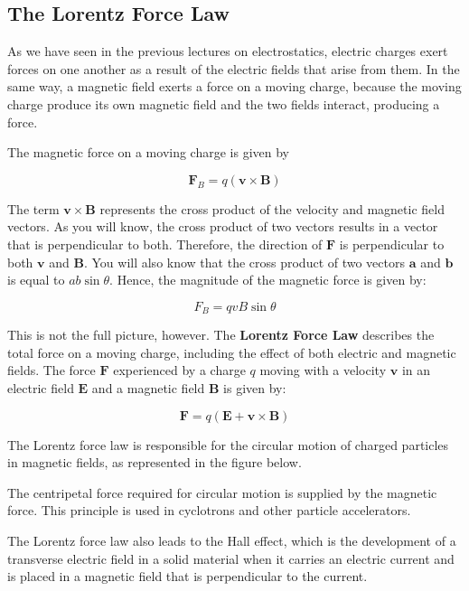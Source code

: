 \documentclass[
  letterpaper,
  DIV=11,
  numbers=noendperiod]{scrreprt}
\begin{document}
\subsection{The Lorentz Force Law}\label{the-lorentz-force-law}

As we have seen in the previous lectures on electrostatics, electric
charges exert forces on one another as a result of the electric fields
that arise from them. In the same way, a magnetic field exerts a force
on a moving charge, because the moving charge produce its own magnetic
field and the two fields interact, producing a force.

The magnetic force on a moving charge is given by

\[
\mathrm{\mathbf{F}}_B = q(\mathrm{\mathbf{v}}\times \mathrm{\mathbf{B}})
\]

The term \(\mathrm{\mathbf{v}}\times \mathrm{\mathbf{B}}\) represents
the cross product of the velocity and magnetic field vectors. As you
will know, the cross product of two vectors results in a vector that is
perpendicular to both. Therefore, the direction of
\(\mathrm{\mathbf{F}}\) is perpendicular to both \(\mathrm{\mathbf{v}}\)
and \(\mathrm{\mathbf{B}}\). You will also know that the cross product
of two vectors \(\mathrm{\mathbf{a}}\) and \(\mathrm{\mathbf{b}}\) is
equal to \(ab \sin\theta\). Hence, the magnitude of the magnetic force
is given by:

\[
F_B = qvB \sin\theta
\]

This is not the full picture, however. The \textbf{Lorentz Force Law}
describes the total force on a moving charge, including the effect of
both electric and magnetic fields. The force \(\mathrm{\mathbf{F}}\)
experienced by a charge \(q\) moving with a velocity
\(\mathrm{\mathbf{v}}\) in an electric field \(\mathrm{\mathbf{E}}\) and
a magnetic field \(\mathrm{\mathbf{B}}\) is given by:

\[
\mathrm{\mathbf{F}}= q(\mathrm{\mathbf{E}}+ \mathrm{\mathbf{v}}\times \mathrm{\mathbf{B}})
\]

The Lorentz force law is responsible for the circular motion of charged
particles in magnetic fields, as represented in the figure below.

The centripetal force required for circular motion is supplied by the
magnetic force. This principle is used in cyclotrons and other particle
accelerators.

The Lorentz force law also leads to the Hall effect, which is the
development of a transverse electric field in a solid material when it
carries an electric current and is placed in a magnetic field that is
perpendicular to the current.
\end{document}

